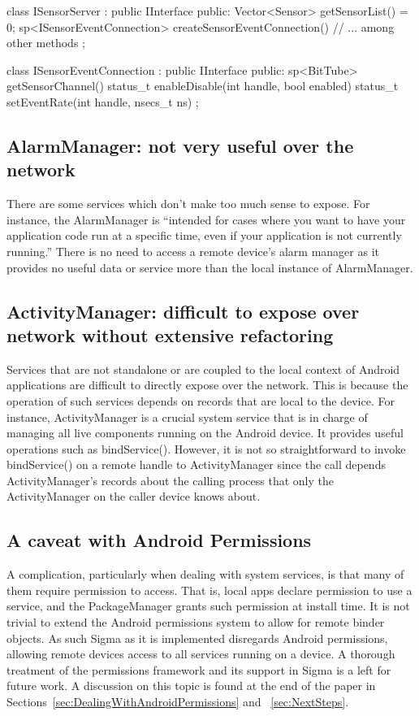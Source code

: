 \documentclass[prodmode]{acmlarge}
\begin{document}
\begin{snippet}
class ISensorServer : public IInterface {
public:
    Vector<Sensor> getSensorList() = 0;
    sp<ISensorEventConnection>
      createSensorEventConnection()
    // ... among other methods
};
\end{snippet}

\begin{snippet}
class ISensorEventConnection : public IInterface {
public:
    sp<BitTube> getSensorChannel()
    status_t enableDisable(int handle, bool enabled)
    status_t setEventRate(int handle, nsecs_t ns)
};
\end{snippet}

\subsection{AlarmManager: not very useful over the network}
There are some services which don't make too much sense to expose. For instance, the AlarmManager is ``intended for cases where you want to have your application code run at a specific time, even if your application is not currently running.'' There is no need to access a remote device's alarm manager as it provides no useful data or service more than the local instance of AlarmManager.

\subsection{ActivityManager: difficult to expose over network without extensive refactoring}
Services that are not standalone or are coupled to the local context of Android applications are difficult to directly expose over the network. This is because the operation of such services depends on records that are local to the device. For instance, ActivityManager is a crucial system service that is in charge of managing all live components running on the Android device. It provides useful operations such as bindService().  However, it is not so straightforward to invoke bindService() on a remote handle to ActivityManager since the call depends ActivityManager's records about the calling process that only the ActivityManager on the caller device knows about.

\subsection{A caveat with Android Permissions}
A complication, particularly when dealing with system services, is that many of them require permission to access. That is, local apps declare permission to use a service, and the PackageManager grants such permission at install time. It is not trivial to extend the Android permissions system to allow for remote binder objects. As such Sigma as it is implemented disregards Android permissions, allowing remote devices access to all services running on a device. A thorough treatment of the permissions framework and its support in Sigma is a left for future work. A discussion on this topic is found at the end of the paper in Sections~\ref{sec:DealingWithAndroidPermissions} and ~\ref{sec:NextSteps}.
\end{document}
